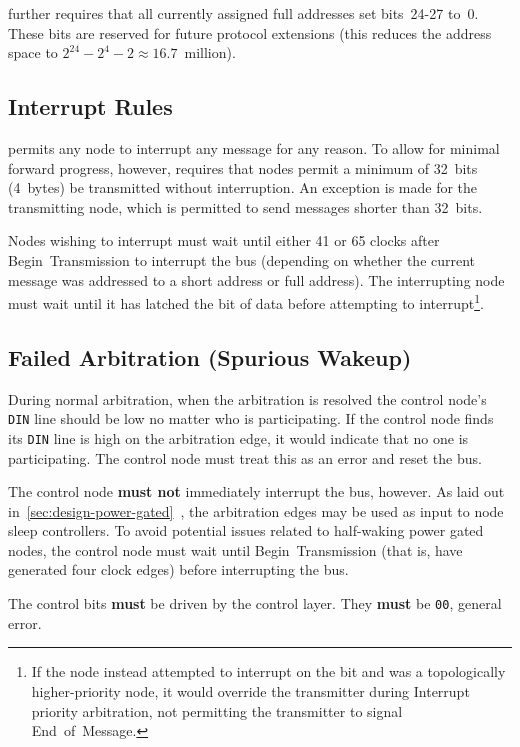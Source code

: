 \bus further requires that all currently assigned full addresses set
bits~24-27 to~0. These bits are reserved for future protocol extensions (this
reduces the address space to $2^{24} - 2^4 -2 \approx 16.7$~million).

\subsection{Interrupt Rules}
\label{sec:spec-interrupt}
\bus permits any node to interrupt any message for any reason. To allow for
minimal forward progress, however, \bus requires that nodes permit a minimum
of 32~bits (4~bytes) be transmitted without interruption. An exception is made
for the transmitting node, which is permitted to send messages shorter than
32~bits.

Nodes wishing to interrupt must wait until either 41 or 65 clocks after
Begin~Transmission to interrupt the bus (depending on whether the current
message was addressed to a short address or full address). The interrupting
node must wait until it has latched the  bit of data before attempting
to interrupt\footnote{
  If the node instead attempted to interrupt on the  bit and was a
  topologically higher-priority node, it would override the transmitter during
  Interrupt priority arbitration, not permitting the transmitter to signal
  End~of~Message.}.

\subsection{Failed Arbitration (Spurious Wakeup)}
\label{sec:spec-spurious}
During normal arbitration, when the arbitration is resolved the control node's
{\tt DIN} line should be low no matter who is participating. If the control
node finds its {\tt DIN} line is high on the arbitration edge, it would
indicate that no one is participating. The control node must treat this as an
error and reset the bus.

The control node {\bf must not} immediately interrupt the bus, however. As
laid out in~\ref{sec:design-power-gated}~, the
arbitration edges may be used as input to node sleep controllers. To avoid
potential issues related to half-waking power gated nodes, the control node
must wait until Begin~Transmission (that is, have generated four clock edges)
before interrupting the bus.

The control bits {\bf must} be driven by the control layer. They {\bf must} be
{\tt 00}, general error.
